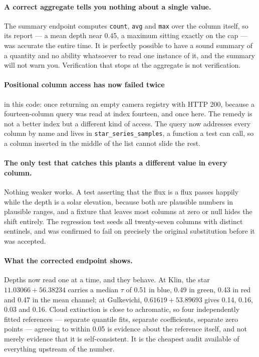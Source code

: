 \documentclass[11pt,a4paper]{article}
\begin{document}
\paragraph{A correct aggregate tells you nothing about a single value.} The
summary endpoint computes \texttt{count}, \texttt{avg} and \texttt{max} over
the column itself, so its report --- a mean depth near \num{0.45}, a maximum
sitting exactly on the cap --- was accurate the entire time. It is perfectly
possible to have a sound summary of a quantity and no ability whatsoever to
read one instance of it, and the summary will not warn you. Verification that
stops at the aggregate is not verification.

\paragraph{Positional column access has now failed twice} in this code: once
returning an empty camera registry with HTTP 200, because a fourteen-column
query was read at index fourteen, and once here. The remedy is not a better
index but a different kind of access. The query now addresses every column by
name and lives in \texttt{star\_series\_samples}, a function a test can call,
so a column inserted in the middle of the list cannot slide the rest.

\paragraph{The only test that catches this plants a different value in every
column.} Nothing weaker works. A test asserting that the flux is a flux passes
happily while the depth is a solar elevation, because both are plausible
numbers in plausible ranges, and a fixture that leaves most columns at zero or
null hides the shift entirely. The regression test seeds all twenty-seven
columns with distinct sentinels, and was confirmed to fail on precisely the
original substitution before it was accepted.

\paragraph{What the corrected endpoint shows.} Depths now read one at a time,
and they behave. At Klin, the star $11.03066{+}56.38234$ carries a median
$\tau$ of \num{0.51} in blue, \num{0.49} in green, \num{0.43} in red and
\num{0.47} in the mean channel; at Gulkevichi, $0.61619{+}53.89693$ gives
\num{0.14}, \num{0.16}, \num{0.03} and \num{0.16}. Cloud extinction is close
to achromatic, so four independently fitted references --- separate quantile
fits, separate coefficients, separate zero points --- agreeing to within
\num{0.05} is evidence about the reference itself, and not merely evidence that
it is self-consistent. It is the cheapest audit available of everything upstream
of the number.
\end{document}
